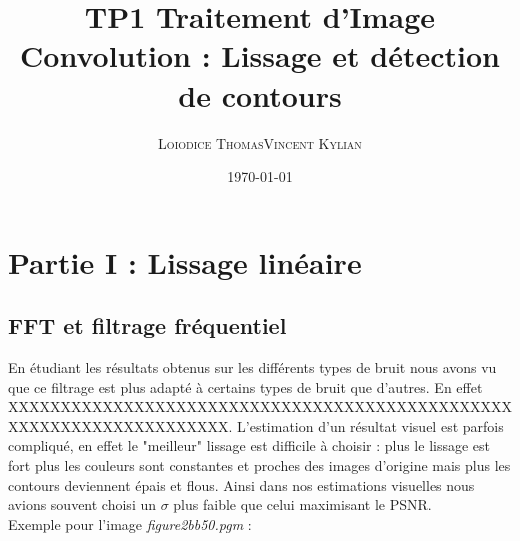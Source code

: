 \documentclass[a4,12pt]{article}
\title{\textbf{TP1 Traitement d'Image\\Convolution : Lissage et détection de contours}}
\author{
\begin{tabular}{cc}
	\textsc{Loiodice Thomas} & \textsc{Vincent Kylian} \\
\end{tabular}}
\date{\small \today}
\begin{document}
\maketitle



\section{Partie I : Lissage linéaire}

\subsection{FFT et filtrage fréquentiel}


En étudiant les résultats obtenus sur les différents types de bruit nous avons vu que ce filtrage est plus adapté à certains types de bruit que d'autres. En effet XXXXXXXXXXXXXXXXXXXXXXXXXXXXXXXXXXXXXXXXXXXXXXXXXXXXXXXXXXXXXXXXXXXXX.
L'estimation d'un résultat visuel est parfois compliqué, en effet le "meilleur" lissage est difficile à choisir : plus le lissage est fort plus les couleurs sont constantes et proches des images d'origine mais plus les contours deviennent épais et flous. Ainsi dans nos estimations visuelles nous avions souvent choisi un $\sigma$ plus faible que celui maximisant le PSNR.\\


Exemple pour l'image \textit{figure2bb50.pgm} :\\
\end{document}
